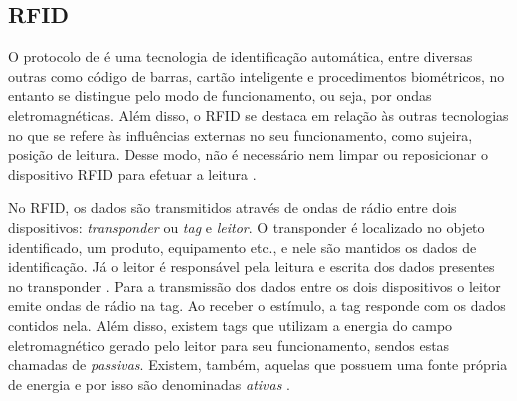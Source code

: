 \subsection{RFID}

O protocolo de  é uma tecnologia de identificação automática, entre diversas outras como código de barras, cartão inteligente e procedimentos biométricos, no entanto se distingue pelo modo de funcionamento, ou seja, por ondas eletromagnéticas. Além disso, o RFID se destaca em relação às outras tecnologias no que se refere às influências externas no seu funcionamento, como sujeira, posição de leitura. Desse modo, não é necessário nem limpar ou reposicionar o dispositivo RFID para efetuar a leitura \cite{Finkenzeller2010}. 

No RFID, os dados são transmitidos através de ondas de rádio entre dois dispositivos: \textit{transponder} ou \textit{tag} e \textit{leitor}. O transponder é localizado no objeto identificado, um produto, equipamento etc., e nele são mantidos os dados de identificação. Já o leitor é responsável pela leitura e escrita dos dados presentes no transponder \cite{Finkenzeller2010}.
Para a transmissão dos dados entre os dois dispositivos o leitor emite ondas de rádio na tag. Ao receber o estímulo, a tag responde com os dados contidos nela. Além disso, existem tags que utilizam a energia do campo eletromagnético gerado pelo leitor para seu funcionamento, sendos estas chamadas de \textit{passivas}. Existem, também, aquelas que possuem uma fonte própria de energia e por isso são denominadas \textit{ativas} \cite{Finkenzeller2010}.





